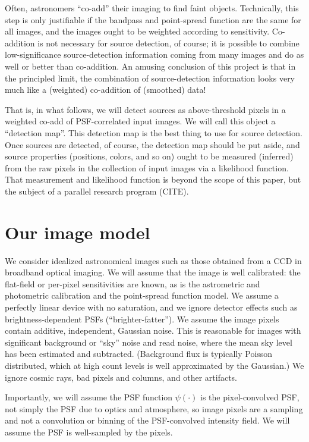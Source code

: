 \documentclass[letterpaper,preprint]{aastex}
\begin{document}
Often, astronomers ``co-add'' their imaging to find faint objects.
Technically, this step is only justifiable if the bandpass and
point-spread function are the same for all images, and the images
ought to be weighted according to sensitivity.
Co-addition is not necessary for source detection, of course; it is
possible to combine low-significance source-detection information
coming from many images and do as well or better than co-addition.
An amusing conclusion of this project is that in the principled limit,
the combination of source-detection information looks very much like a
(weighted) co-addition of (smoothed) data!

That is, in what follows, we will detect sources as above-threshold
pixels in a weighted co-add of PSF-correlated input images.
We will call this object a ``detection map''.
This detection map is the best thing to use for source detection.
Once sources are detected, of course, the detection map should be put
aside, and source properties (positions, colors, and so on) ought to
be measured (inferred) from the raw pixels in the collection of input
images via a likelihood function.
That measurement and likelihood function is beyond the scope of this
paper, but the subject of a parallel research program (CITE).

\section{Our image model}

We consider idealized astronomical images such as those obtained from
a CCD in broadband optical imaging.
%
We will assume that the image is well calibrated: the flat-field or
per-pixel sensitivities are known, as is the astrometric and
photometric calibration and the point-spread function model.
%
We assume a perfectly linear device with no saturation, and we ignore
detector effects such as brightness-dependent PSFs
(``brighter-fatter'').
%
We assume the image pixels contain additive, independent, Gaussian
noise.  This is reasonable for images with significant background or
``sky'' noise and read noise, where the mean sky level has been
estimated and subtracted.  (Background flux is typically Poisson
distributed, which at high count levels is well approximated by the
Gaussian.)  We ignore cosmic rays, bad pixels and columns, and other
artifacts.
%

Importantly, we will assume the PSF function $\psi(\cdot)$ is the
pixel-convolved PSF, not simply the PSF due to optics and atmosphere,
so image pixels are a sampling and not a convolution or binning of the
PSF-convolved intensity field.
We will assume the PSF is well-sampled by the pixels.
\end{document}
